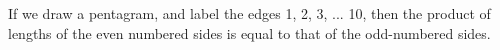 If we draw a pentagram, and label the edges 1, 2, 3, ... 10, then the
product of lengths of the even numbered sides is equal to that of the
odd-numbered sides.